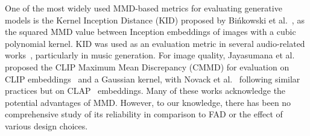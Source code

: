 One of the most widely used MMD-based metrics for evaluating generative models is the Kernel Inception Distance (KID) proposed by Bińkowski et al.~\cite{binkowski2018demystifyingmmd}, as the squared MMD value between Inception embeddings of images with a cubic polynomial kernel. KID was used as an evaluation metric in several audio-related works~\cite{nistal2021comparing, nistal2024diff, grachten2024measuring, shi2024versa}, particularly in music generation.
For image quality, Jayasumana et al.~\cite{jayasumana2024rethinking} proposed the CLIP Maximum Mean Discrepancy (CMMD) for evaluation on CLIP embeddings~\cite{clip} and a Gaussian kernel, with Novack et al.~\cite{novack2024presto} following similar practices but on CLAP~\cite{clap_laion} embeddings.
Many of these works acknowledge the potential advantages of MMD. However, to our knowledge, there has been no comprehensive study of its reliability in comparison to FAD or the effect of various design choices.


